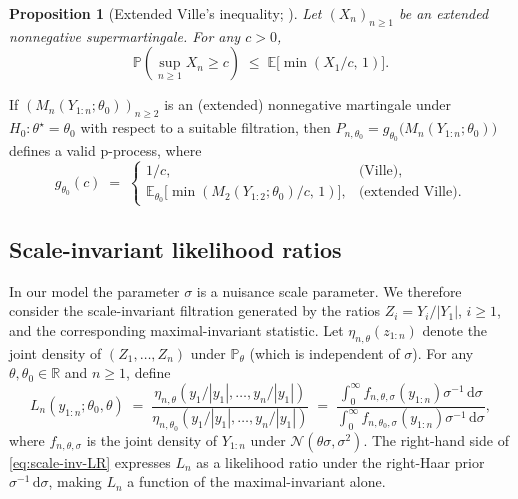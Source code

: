 \documentclass{article}%
\newtheorem{proposition}[theorem]{Proposition}
\newcommand{\R}{\mathbb{R}}
\newcommand{\E}{\mathbb{E}}
\newcommand{\Prob}{\mathbb{P}}
\newcommand{\dd}{\,\mathrm{d}}
\begin{document}
\begin{proposition}[Extended Ville's inequality;
{\citealp[Thm.~4.1]{wang2025extended}}]
\label{prop:eville}
Let \((X_n)_{n\geq 1}\) be an extended nonnegative supermartingale.
For any \(c>0\),
\[
   \Prob\left(\sup_{n\geq 1} X_n\geq c\right)\;\leq\;
   \E\!\bigl[\min(X_1/c,\,1)\bigr].
\]
\end{proposition}

If \((M_n(Y_{1:n};\theta_0))_{n\geq 2}\) is an (extended) nonnegative
martingale under \(H_0:\theta^\star=\theta_0\) with respect to a
suitable filtration, then
\(P_{n,\theta_0}=g_{\theta_0}\bigl(M_n(Y_{1:n};\theta_0)\bigr)\)
defines a valid p-process, where
\begin{equation}\label{eq:gtheta0}
  g_{\theta_0}(c)\;=\;
   \begin{cases}
     1/c, & \text{(Ville)},\\[2pt]
     \E_{\theta_0}\!\bigl[\min(M_2(Y_{1:2};\theta_0)/c,\,1)\bigr],
       & \text{(extended Ville)}.
   \end{cases}
\end{equation}


\subsection{Scale-invariant likelihood ratios}\label{ssec:scale-inv}

In our model the parameter \(\sigma\) is a nuisance scale parameter.
We therefore consider the scale-invariant filtration generated by the
ratios \(Z_i=Y_i/|Y_1|\), \(i\geq 1\), and the corresponding
maximal-invariant statistic. Let
\(\eta_{n,\theta}(z_{1:n})\) denote the joint density of
\((Z_1,\ldots,Z_n)\) under \(\Prob_\theta\) (which is independent of
\(\sigma\)). For any \(\theta,\theta_0\in\R\) and \(n\geq 1\), define
\begin{equation}\label{eq:scale-inv-LR}
  L_n(y_{1:n};\theta_0,\theta)
  \;=\;\frac{\eta_{n,\theta}(y_1/|y_1|,\ldots,y_n/|y_1|)}
            {\eta_{n,\theta_0}(y_1/|y_1|,\ldots,y_n/|y_1|)}
  \;=\;\frac{\int_0^\infty f_{n,\theta,\sigma}(y_{1:n})\sigma^{-1}\dd\sigma}
            {\int_0^\infty f_{n,\theta_0,\sigma}(y_{1:n})\sigma^{-1}\dd\sigma},
\end{equation}
where \(f_{n,\theta,\sigma}\) is the joint density of \(Y_{1:n}\)
under \(\mathcal N(\theta\sigma,\sigma^2)\). The right-hand side of
\eqref{eq:scale-inv-LR} expresses \(L_n\) as a likelihood ratio under
the right-Haar prior \(\sigma^{-1}\dd\sigma\), making \(L_n\) a
function of the maximal-invariant alone.
\end{document}
